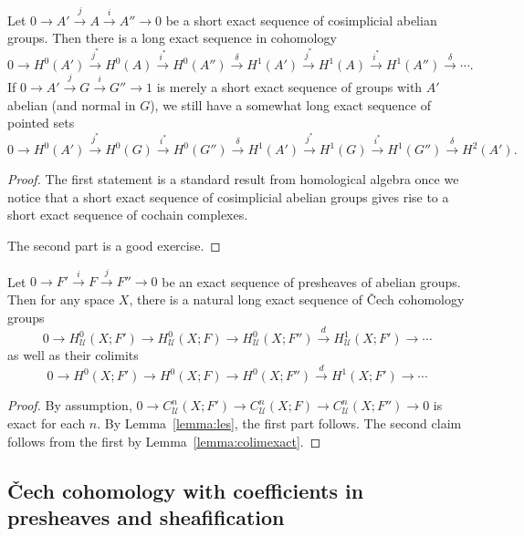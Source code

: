 \documentclass[a4paper,openany]{scrbook}
\begin{document}
\begin{lemma}\label{lemma:les}
Let $0 \to A' \xrightarrow{j} A \xrightarrow{i} A'' \to 0$ be a short exact sequence of cosimplicial abelian groups. Then there is a long exact sequence in cohomology
\[
0 \to H^0(A') \xrightarrow{j^*} H^0(A) \xrightarrow{i^*} H^0(A'') \xrightarrow{\delta} H^1(A') \xrightarrow{j^*} H^1(A) \xrightarrow{i^*} H^1(A'') \xrightarrow{\delta} \cdots.
\]
If $0 \to A' \xrightarrow{j} G \xrightarrow{i} G'' \to 1$ is merely a short exact sequence of groups with $A'$ abelian (and normal in $G$), we still have a somewhat long exact sequence of pointed sets
\[
0 \to H^0(A') \xrightarrow{j^*} H^0(G) \xrightarrow{i^*} H^0(G'') \xrightarrow{\delta} H^1(A') \xrightarrow{j^*} H^1(G) \xrightarrow{i^*} H^1(G'') \xrightarrow{\delta} H^2(A').
\]
\end{lemma}
\begin{proof}
The first statement is a standard result from homological algebra once we notice that a short exact sequence of cosimplicial abelian groups gives rise to a short exact sequence of cochain complexes.

The second part is a good exercise.
\end{proof}

\begin{corollary} \label{cor:lesfromsesofpresheaves}
Let $0 \to F' \xrightarrow{i} F \xrightarrow{j} F'' \to 0$ be an exact sequence of presheaves of abelian groups.
Then for any space $X$, there is a natural long exact sequence of Čech cohomology groups
\[
0 \to H^0_{\mathcal U}(X;F') \to H^0_{\mathcal U}(X;F) \to H^0_{\mathcal U}(X;F'') \xrightarrow{d} H^1_{\mathcal U}(X;F') \to \cdots
\]
as well as their colimits
\[
0 \to H^0(X;F') \to H^0(X;F) \to H^0(X;F'') \xrightarrow{d} H^1(X;F') \to \cdots
\]
\end{corollary}
\begin{proof}
By assumption, $0 \to C^n_{\mathcal U}(X;F') \to C^n_{\mathcal U}(X;F) \to C^n_{\mathcal U}(X;F'') \to 0$ is exact for each $n$. By Lemma~\ref{lemma:les}, the first part follows. The second claim follows from the first by Lemma~\ref{lemma:colimexact}.
\end{proof}

\subsection{\v Cech cohomology with coefficients in presheaves and sheafification}
\end{document}
